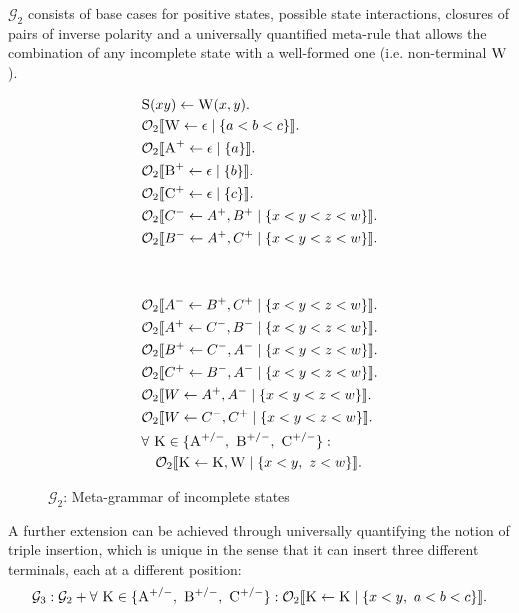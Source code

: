 \documentclass[nonatbib,numbers,10pt]{llncs}
\newcommand\s{\textsc}
\newcommand{\Orderr}[5]{
	\mathcal{#1}_{#5}\llbracket #2 \leftarrow #3 \mid \{ #4 \} \rrbracket.
}
\newcommand{\Or}[4]{\Orderr{O}{#1}{#2}{#3}{#4}}
\begin{document}
$\mathcal{G}_2$ consists of base cases for positive states, possible state interactions, closures of pairs of inverse polarity and a universally quantified meta-rule that allows the combination of any incomplete state with a well-formed one (i.e. non-terminal $\s{W}$).
\begin{figure}
    \centering
    \begin{subfigure}{}
		\begin{minipage}{.2\textwidth}
		\begin{align*}
		&\s{S}(xy) \leftarrow \s{W}(x,y). \\
		&\Or{\s{W}}{\epsilon}{a < b < c}{2} \\
		&\Or{\s{A}^+}{\epsilon}{a}{2} \\
		&\Or{\s{B}^+}{\epsilon}{b}{2} \\
		&\Or{\s{C}^+}{\epsilon}{c}{2} \\
		&\Or{C^-}{A^+, B^+}{x < y < z < w}{2} \\
		&\Or{B^-}{A^+, C^+}{x < y < z < w}{2}
		\end{align*}
		\end{minipage}
	\end{subfigure}%
	~ ~ ~
    \begin{subfigure}{}
	    \begin{minipage}{.2\textwidth}
		\begin{align*}
		&\Or{A^-}{B^+, C^+}{x < y < z < w}{2} \\
		&\Or{A^+}{C^-, B^-}{x < y < z < w}{2} \\
		&\Or{B^+}{C^-, A^-}{x < y < z < w}{2} \\
		&\Or{C^+}{B^-, A^-}{x < y < z < w}{2} \\
		&\Or{W}{A^+, A^-}{x < y < z < w}{2} \\
		&\Or{W}{C^-, C^+}{x < y < z < w}{2} \\
		&\forall \ \s{K} \in \{\textsc{A}^{+/-},\ \textsc{B}^{+/-},\ \textsc{C}^{+/-}\}:\\ 
		&\quad\Or{\s{K}}{\s{K}, \s{W}}{x < y,\ z < w}{2}
		\end{align*}
		\end{minipage}
   \end{subfigure}
    \caption{$\mathcal{G}_2$: Meta-grammar of incomplete states}%
    \label{fig:g2}
\end{figure}

A further extension can be achieved through universally quantifying the notion of triple insertion, which is unique in the sense that it can insert three different terminals, each at a different position:
\[
\mathcal{G}_3: \mathcal{G}_2 + \forall \ \s{K} \in \{\textsc{A}^{+/-},\ \textsc{B}^{+/-},\ \textsc{C}^{+/-}\}: \Or{\s{K}}{\s{K}}{x < y,\ a < b < c}{2}
\]
\end{document}
